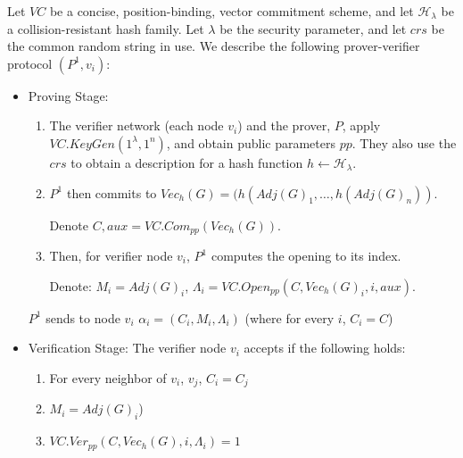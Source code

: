 \documentclass{llncs}
\numberwithin{equation}{section}
\numberwithin{figure}{section}
\theoremstyle{definition}
\begin{document}
Let $VC$ be a concise, position-binding, vector commitment scheme, and let $\mathcal{H}_\lambda$ be a collision-resistant hash family. Let $\lambda$ be the security parameter, and let $crs$ be the common random string in use.
We describe the following prover-verifier protocol $(P^1, v_i)$:
\begin{itemize}
    \item Proving Stage:
    \begin{enumerate}
        \item The verifier network (each node $v_i$) and the prover, $P$, apply $VC.KeyGen(1^\lambda, 1^{n})$, and obtain public parameters $pp$. They also use the $crs$ to obtain a description for a hash function $h\leftarrow\mathcal{H}_\lambda$.
        \item $P^1$ then commits to $Vec_h(G) = (h(Adj(G)_1,\ldots,h(Adj(G)_n))$.
        
        Denote $C, aux = VC.Com_{pp}(Vec_h(G))$.
        \item\sloppy Then, for verifier node $v_i$, $P^1$ computes the opening to its index.
        
        Denote: $M_i = Adj(G)_i$, $\Lambda_i = VC.Open_{pp}(C, Vec_h(G)_i, i, aux)$.
    \end{enumerate}
    $P^1$ sends to node $v_i$ $\alpha_i = (C_i, M_i, \Lambda_i)$ (where for every $i$, $C_i = C$)
    \item Verification Stage: The verifier node $v_i$ accepts if the following holds:
    \begin{enumerate}
        \item For every neighbor of $v_i$, $v_j$, $C_i=C_j$
        \item $M_i = Adj(G)_i$)
        \item $VC.Ver_{pp}(C, Vec_h(G), i, \Lambda_i) = 1$
    \end{enumerate}
\end{itemize}
\end{document}
